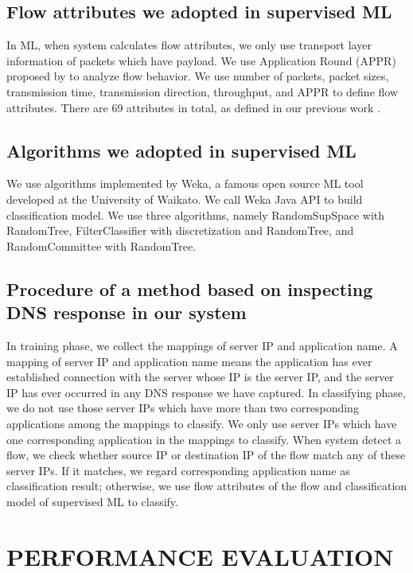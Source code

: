 \documentclass[journal]{IEEEtran}
\begin{document}
\subsection{Flow attributes we adopted in supervised ML}
In ML, when system calculates flow attributes, we only use transport layer information of packets which have payload.
We use Application Round (APPR) proposed by \cite{classfication-cloud} to analyze flow behavior.
We use number of packets, packet sizes, transmission time,
transmission direction, throughput, and APPR to define flow attributes.
There are 69 attributes in total, as defined in our previous work \cite{Chia-Chin-master}.



\subsection{Algorithms we adopted in supervised ML}
We use algorithms implemented by Weka, a famous open source ML tool developed at the University of Waikato.
We call Weka Java API to build classification model.
We use three algorithms, namely RandomSupSpace with RandomTree\cite{TinKamHo1998},
FilterClassifier with discretization and RandomTree, and RandomCommittee with RandomTree.



\subsection{Procedure of a method based on inspecting DNS response in our system}
In training phase, we collect the mappings of server IP and application name.
A mapping of server IP and application name means the application has ever established connection
with the server whose IP is the server IP, and the server IP has ever occurred in any DNS response we have captured.
In classifying phase, we do not use those server IPs which have more than two corresponding applications among the mappings to classify.
We only use server IPs which have one corresponding application in the mappings to classify.
When system detect a flow, we check whether source IP or destination IP of the flow match any of these server IPs.
If it matches, we regard corresponding application name as classification result;
otherwise, we use flow attributes of the flow and classification model of supervised ML to classify.





\section{PERFORMANCE EVALUATION}
\end{document}
